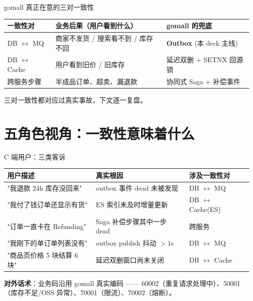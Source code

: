 \documentclass[aspectratio=169,11pt]{beamer}
\begin{document}
\begin{frame}[shrink]{gomall 真正在意的三对一致性}
\begin{tabular}{@{}lll@{}}
\toprule
一致性对 & 业务后果（用户看到什么） & gomall 的兜底 \\
\midrule
DB $\leftrightarrow$ MQ      & 商家不发货 / 搜索看不到 / 库存不回 & \textbf{Outbox} (本 deck 主线) \\
DB $\leftrightarrow$ Cache   & 用户看到旧价 / 旧库存             & 延迟双删 + SETNX 回源锁 \\
跨服务步骤                   & 半成品订单、超卖、漏退款          & 协同式 Saga + 补偿事件 \\
\bottomrule
\end{tabular}
\vspace{2mm}
\small 三对一致性都对应过真实事故，下文逐一复盘。
\end{frame}

\section{五角色视角：一致性意味着什么}

\begin{frame}[shrink]{C 端用户：三类客诉}
\begin{tabular}{@{}lll@{}}
\toprule
用户描述 & 真实根因 & 涉及一致性对 \\
\midrule
"我退款 24h 库存没回来" & outbox 事件 dead 未被发现 & DB $\leftrightarrow$ MQ \\
"我付了钱订单还显示有货" & ES 索引未及时增量更新 & DB $\leftrightarrow$ Cache(ES) \\
"订单一直卡在 Refunding" & Saga 补偿步骤其中一步 dead & 跨服务 \\
"我刚下的单订单列表没有" & outbox publish 抖动 $> 1$s & DB $\leftrightarrow$ MQ \\
"商品页价格 5 块结算 6 块" & 延迟双删窗口尚未关闭   & DB $\leftrightarrow$ Cache \\
\bottomrule
\end{tabular}
\vspace{2mm}
\textbf{对外话术}：业务码沿用 gomall 真实编码 —— 60002（重复请求处理中）、50001（库存不足/OSS 异常）、70001（限流）、70002（熔断）。
\end{frame}
\end{document}
